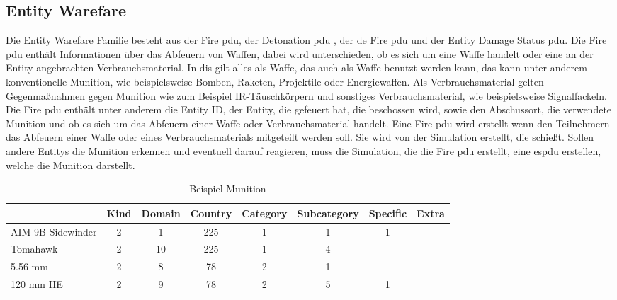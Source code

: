 \subsection{Entity Warefare}
Die Entity Warefare Familie besteht aus der Fire \ac{pdu}, der Detonation \ac{pdu} , der \ac{de} Fire \ac{pdu} und der Entity Damage Status \ac{pdu}.
Die Fire \ac{pdu} enthält Informationen über das Abfeuern von Waffen, dabei wird unterschieden, ob es sich um eine Waffe handelt oder eine an der Entity angebrachten Verbrauchsmaterial. In \ac{dis} gilt alles als Waffe, das auch als Waffe benutzt werden kann, das kann unter anderem konventionelle Munition, wie beispielsweise Bomben, Raketen, Projektile oder Energiewaffen. Als Verbrauchsmaterial gelten Gegenmaßnahmen gegen Munition wie zum Beispiel IR-Täuschkörpern und sonstiges Verbrauchsmaterial, wie beispielsweise Signalfackeln.  Die Fire \ac{pdu} enthält unter anderem  die Entity ID, der Entity, die gefeuert hat, die beschossen wird, sowie den Abschussort, die verwendete Munition und ob es sich um das Abfeuern einer Waffe oder Verbrauchsmaterial handelt.
Eine Fire \ac{pdu} wird erstellt wenn den Teilnehmern das Abfeuern einer Waffe oder eines Verbrauchsmaterials mitgeteilt werden soll. Sie wird von der Simulation erstellt, die schießt. Sollen andere Entitys die Munition erkennen und eventuell darauf reagieren, muss die Simulation, die die Fire \ac{pdu} erstellt, eine \ac{espdu} erstellen, welche die Munition darstellt. 
\begin{table}[H]
	\centering
	\label{example_munition}
	\begin{tabular}{|l|c|c|c|c|c|c|c|}
		\hline
		& \multicolumn{1}{l|}{Kind} & \multicolumn{1}{l|}{Domain} & \multicolumn{1}{l|}{Country} & \multicolumn{1}{l|}{Category} & \multicolumn{1}{l|}{Subcategory} & \multicolumn{1}{l|}{Specific} & \multicolumn{1}{l|}{Extra} \\ \hline
		AIM-9B Sidewinder & 2                         & 1                           & 225                          & 1                             & 1                                & 1                             &                            \\ \hline
		Tomahawk          & 2                         & 10                          & 225                          & 1                             & 4                                &                               &                            \\ \hline
		5.56 mm           & 2                         & 8                           & 78                           & 2                             & 1                                &                               &                            \\ \hline
		120 mm HE         & 2                         & 9                           & 78                           & 2                             & 5                                & 1                             &                            \\ \hline
	\end{tabular}
	\caption{Beispiel Munition}
\end{table}

